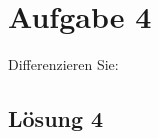 \documentclass[main.tex]{subfiles}
\begin{document}
\section{Aufgabe 4}
Differenzieren Sie:

\subsection{Lösung 4}
\end{document}

